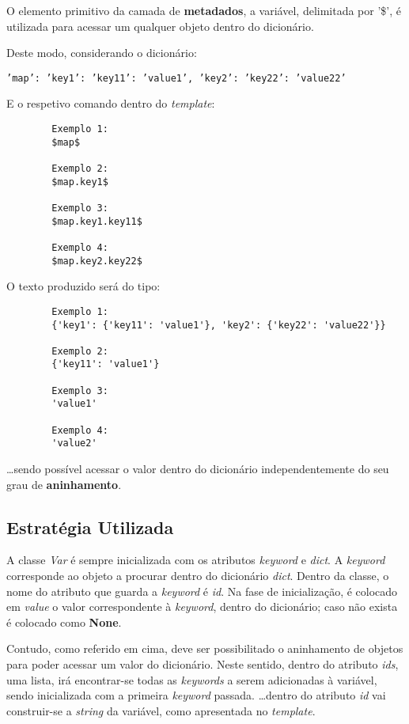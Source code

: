 \documentclass[../relatorio.tex]{subfiles}
\begin{document}
    O elemento primitivo da camada de \textbf{metadados},
    a variável, delimitada por '\$', é utilizada para 
    acessar um qualquer objeto dentro do dicionário.

    Deste modo, considerando o dicionário:
    
    \texttt{'map': {'key1': {'key11': 'value1'}, 'key2': {'key22': 'value22'}}}

    E o respetivo comando dentro do \textit{template}:
    \begin{verbatim}
        Exemplo 1:
        $map$

        Exemplo 2:
        $map.key1$

        Exemplo 3:
        $map.key1.key11$

        Exemplo 4:
        $map.key2.key22$
    \end{verbatim}

    O texto produzido será do tipo: 

    \begin{verbatim}
        Exemplo 1:
        {'key1': {'key11': 'value1'}, 'key2': {'key22': 'value22'}}

        Exemplo 2:
        {'key11': 'value1'}

        Exemplo 3:
        'value1'

        Exemplo 4:
        'value2'
    \end{verbatim}

    \dots sendo possível acessar o valor dentro do dicionário
    independentemente do seu grau de \textbf{aninhamento}.

    \subsection*{Estratégia Utilizada}
    A classe \textit{Var} é sempre inicializada com os atributos \textit{keyword} e
    \textit{dict}.
    A \textit{keyword} corresponde ao objeto a procurar dentro do dicionário \textit{dict}.
    Dentro da classe, o nome do atributo que guarda a \textit{keyword} é \textit{id}.
    Na fase de inicialização, é colocado em \textit{value} o valor correspondente 
    à \textit{keyword}, dentro do dicionário; caso não exista é colocado como \textbf{None}.

    Contudo, como referido em cima, deve ser possibilitado o aninhamento de objetos para poder 
    acessar um valor do dicionário.
    Neste sentido, dentro do atributo \textit{ids}, uma lista, irá encontrar-se todas 
    as \textit{keywords} a serem adicionadas à variável, sendo inicializada com a primeira
    \textit{keyword} passada.
    \dots dentro do atributo \textit{id} vai construir-se a \textit{string} da variável, como 
    apresentada no \textit{template}.
\end{document}
